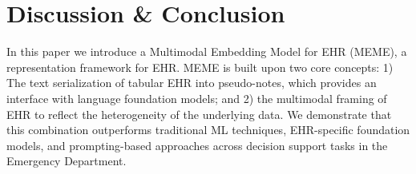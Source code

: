 \documentclass{article}
\theoremstyle{plain}
\theoremstyle{definition}
\theoremstyle{remark}
\begin{document}
{%





\section{Discussion \& Conclusion}

In this paper we introduce {a Multimodal Embedding Model for EHR (MEME), a representation framework for EHR. MEME is built upon two core concepts: 1) The text serialization of tabular EHR into pseudo-notes, which provides an interface with language foundation models; and 2) the multimodal framing of EHR to reflect the heterogeneity of the underlying data.} \iffalse{an approach for transforming multimodal tabular EHR data into clinical pseudo-notes. This transformation enhances the interpretability of our data inputs and utility of EHR data in various healthcare-related tasks. The pseudo-notes method not only simplifies data handling but also effectively bridges the gap between traditional EHR formats and advanced NLP techniques employed in modern machine learning.} \fi
{We demonstrate that this combination outperforms traditional ML techniques, EHR-specific foundation models, and prompting-based approaches across decision support tasks in the Emergency Department.} 

}
\end{document}
